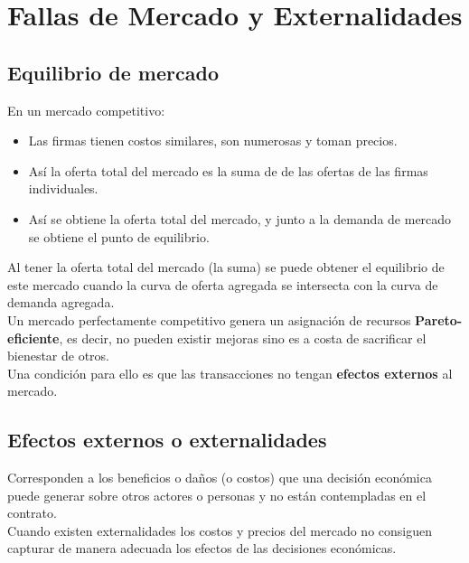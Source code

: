 \section{Fallas de Mercado y Externalidades}


\subsection{Equilibrio de mercado}

En un mercado competitivo:

\begin{itemize}
    \item Las firmas tienen costos similares, son numerosas y toman precios.
    \item Así la oferta total del mercado es la suma de de las ofertas de las firmas individuales.
    \item Así se obtiene la oferta total del mercado, y junto a la demanda de mercado se obtiene el punto de equilibrio.
\end{itemize}

Al tener la oferta total del mercado (la suma) se puede obtener el equilibrio de este mercado cuando la curva de oferta agregada se intersecta con la curva de demanda agregada.\\

Un mercado perfectamente competitivo genera un asignación de recursos \textbf{Pareto-eficiente}, es decir, no pueden existir mejoras sino es a costa de sacrificar el bienestar de otros.\\

Una condición para ello es que las transacciones no tengan \textbf{efectos externos} al mercado.


\subsection{Efectos externos o externalidades}
Corresponden a los beneficios o daños (o costos) que una decisión económica puede generar sobre otros actores o personas y no están contempladas en el contrato.\\

Cuando existen externalidades los costos y precios del mercado no consiguen capturar de manera adecuada los efectos de las decisiones económicas.\\

